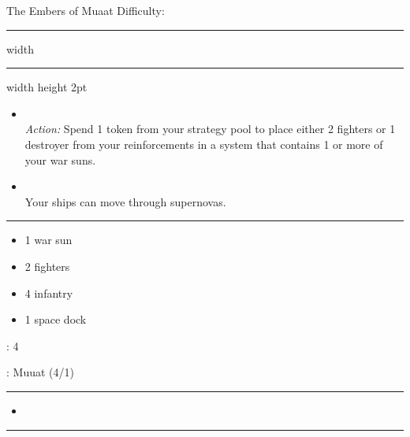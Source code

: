 {\handel\Huge The Embers of Muaat} \hfill {\Large Difficulty: \hard} \vspace{-4pt}\\
\hrule width \hsize \kern 1mm \hrule width \hsize height 2pt


\begin{multicols}{2}


\begin{itemize}
\item {}\\
\emph{Action:}
Spend 1 token from your strategy pool to place either 2 fighters or 1 destroyer from your reinforcements in a system that contains 1 or more of your war suns.
\item {}\\
Your ships can move through supernovas.
\end{itemize}


\vspace{-10pt}\rule{\hsize}{0.4pt}\vspace{5pt}


\vspace{-5pt}
\begin{multicols}{2}
\begin{itemize}
\item 1 war sun
\item 2 fighters
\item 4 infantry
\item 1 space dock
\end{itemize}
\end{multicols}

\vspace{-5pt}
: 4

\vspace{2pt}
: Muuat (4/1)

\rule{\hsize}{0.4pt}\vspace{5pt}


\begin{itemize}
\item \plasma
\end{itemize}

\vspace{-10pt}\rule{\hsize}{0.4pt}\vspace{5pt}


\end{multicols}
